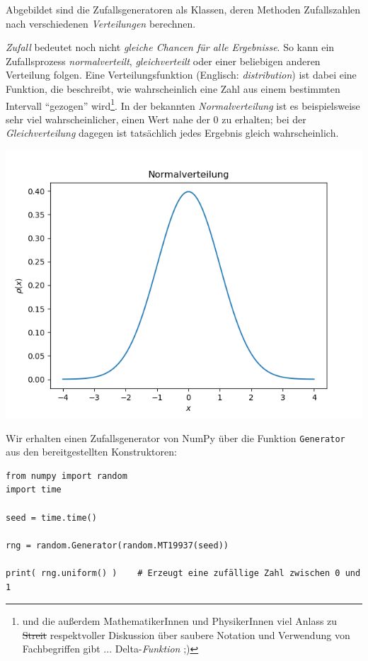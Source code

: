 Abgebildet sind die Zufallsgeneratoren als Klassen, deren Methoden Zufallszahlen nach verschiedenen \emph{Verteilungen} berechnen.
\begin{hintbox}[Verteilungsfunktionen]
\emph{Zufall} bedeutet noch nicht \emph{gleiche Chancen für alle Ergebnisse}. So kann ein Zufallsprozess \eg \emph{normalverteilt}, \emph{gleichverteilt} oder einer beliebigen anderen Verteilung folgen. Eine Verteilungsfunktion (Englisch: \emph{distribution}) ist dabei eine Funktion, die beschreibt, wie wahrscheinlich eine Zahl aus einem bestimmten Intervall \enquote{gezogen} wird\footnote{und die außerdem MathematikerInnen und PhysikerInnen viel Anlass zu \sout{Streit} respektvoller Diskussion über saubere Notation und Verwendung von Fachbegriffen gibt ... Delta-\emph{Funktion} ;)}. In der bekannten \emph{Normalverteilung} ist es beispielsweise sehr viel wahrscheinlicher, einen Wert nahe der 0 zu erhalten; bei der \emph{Gleichverteilung} dagegen ist tatsächlich jedes Ergebnis gleich wahrscheinlich.

\begin{center}
	\includegraphics[width=.5\linewidth]{./gfx/gaussDistribution}
\end{center}
\end{hintbox}

Wir erhalten einen Zufallsgenerator von NumPy über die Funktion \texttt{Generator} aus den bereitgestellten Konstruktoren:
\begin{codebox}
\begin{verbatim}
from numpy import random
import time

seed = time.time()

rng = random.Generator(random.MT19937(seed))

print( rng.uniform() )    # Erzeugt eine zufällige Zahl zwischen 0 und 1
\end{verbatim}
\end{codebox}

